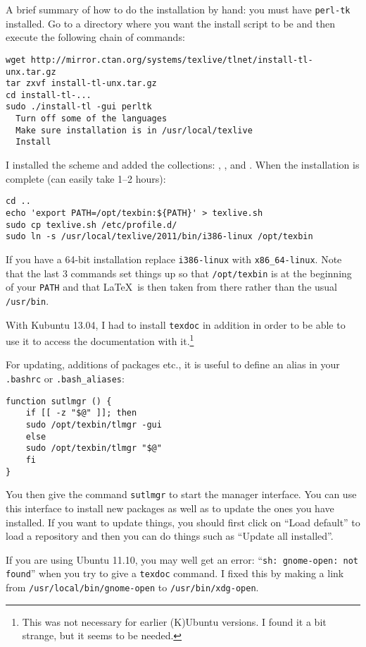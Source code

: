 A brief summary of how to do the installation by hand: you must have
\texttt{perl-tk} installed.
Go to a directory where you want the
install script to be and then execute the following chain of commands:
\begin{verbatim}
wget http://mirror.ctan.org/systems/texlive/tlnet/install-tl-unx.tar.gz
tar zxvf install-tl-unx.tar.gz
cd install-tl-...
sudo ./install-tl -gui perltk
  Turn off some of the languages
  Make sure installation is in /usr/local/texlive
  Install
\end{verbatim}
I installed the scheme  and added the
collections: , ,  and
.  When the
installation is complete (can easily take \numrange{1}{2} hours):
\begin{verbatim}
cd ..
echo 'export PATH=/opt/texbin:${PATH}' > texlive.sh
sudo cp texlive.sh /etc/profile.d/
sudo ln -s /usr/local/texlive/2011/bin/i386-linux /opt/texbin
\end{verbatim}
If you have a 64-bit installation replace \texttt{i386-linux} with
\texttt{x86\_64-linux}. Note that the last 3 commands set things up so
that \texttt{/opt/texbin} is at the beginning of your \texttt{PATH}
and that \LaTeX\ is then taken from there rather than the usual
\texttt{/usr/bin}.

With Kubuntu 13.04, I had to install \texttt{texdoc} in addition in
order to be able to use it to access the documentation with
it.\footnote{This was not necessary for earlier (K)Ubuntu versions. I
  found it a bit strange, but it seems to be needed.}

For updating, additions of packages etc., it is useful to define an
alias in your \texttt{.bashrc} or \texttt{.bash\_aliases}:
\begin{verbatim}
function sutlmgr () {
    if [[ -z "$@" ]]; then
	sudo /opt/texbin/tlmgr -gui
    else
	sudo /opt/texbin/tlmgr "$@"
    fi
}
\end{verbatim}
You then give the command \texttt{sutlmgr} to start the \TeXLive
manager interface. You can use this interface to install new packages
as well as to update the ones you have installed. If you want to
update things, you should first click on \enquote{Load default} to
load a repository and then you can do things such as \enquote{Update
  all installed}.

If you are using Ubuntu 11.10, you may well get an error:
\enquote{\texttt{sh: gnome-open: not found}} when you try to give a
\texttt{texdoc} command. I fixed this by making a
link from \texttt{/usr/local/bin/gnome-open} to
\texttt{/usr/bin/xdg-open}.



